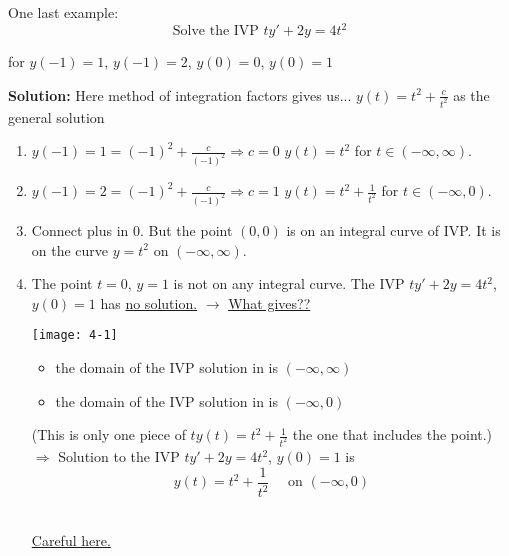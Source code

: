 \begin{example-N}
	One last example:\\
	\begin{equation*}
		\text{Solve the IVP } ty' + 2y = 4t^2
	\end{equation*}
	\begin{center}
		for  $y(-1) = 1$, \quad {} $y(-1) = 2$,\quad {} $y(0) = 0$,\quad {} $y(0) = 1$\quad 
	\end{center}
	\textbf{Solution: }Here method of integration factors gives us... $y(t)= t^2 + \frac{c}{t^2}$ as the general solution
	\begin{enumerate}[label=\protect\circled{\alph*}]
		\item $y(-1) = 1 = (-1)^2 + \frac{c}{(-1)^2} \Rightarrow c = 0$ \quad \quad $y(t) = t^2$ for $t \in (-\infty, \infty)$.
		\item $y(-1) = 2 = (-1)^2 + \frac{c}{(-1)^2} \Rightarrow c = 1$ \quad \quad $y(t) = t^2 + \frac{1}{t^2}$ for $t \in (-\infty, 0)$.
		\item Connect plus in 0. But the point $(0,0)$ is on an integral curve of IVP. It is on the curve $y = t^2$ on $(-\infty, \infty)$.
		\item The point $t = 0$, $y = 1$ is not on any integral curve. The IVP $ty' + 2y = 4t^2$, $y(0) = 1$ has \underline{no solution.} $\longrightarrow$ \underline{What gives??}\\
		\begin{center}
		\texttt{[image: 4-1]}	
		\end{center}
		\begin{itemize}
			\item the domain of the IVP solution in  is $(-\infty, \infty)$
			\item the domain of the IVP solution in  is $(-\infty, 0)$
		\end{itemize}
		(This is only one piece of $ty(t) = t^2 + \frac{1}{t^2}$ the one that includes the point.)
		$\Rightarrow$ Solution to the IVP $ty' + 2y = 4t^2$, $y(0) = 1$ is
		\begin{equation*}
			\boxed{y(t) = t^2 + \frac{1}{t^2} \quad \text{ on } (-\infty, 0)}
		\end{equation*}
		\\
		\begin{center}
			\huge \underline{Careful here.}
		\end{center}
	\end{enumerate}
	
	 
\end{example-N}
